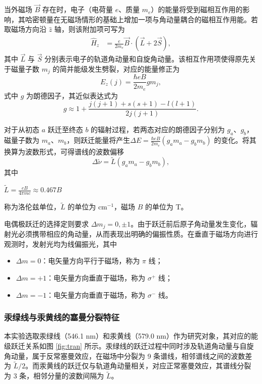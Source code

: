 \documentclass[a4paper, 1.5lines]{ctexart}
\begin{document}
当外磁场 $\vec{B}$ 存在时，电子（电荷量 $e$、质量 $m_e$）的能量将受到磁相互作用的影响，其哈密顿量在无磁场情形的基础上增加一项与角动量耦合的磁相互作用能。若取磁场方向沿 $\hat{z}$ 轴，则该附加项可写为
\begin{align}
\hat{H}_z & = \frac{e}{2m_e} \vec{B} \cdot (\vec{L} + 2\vec{S}),
\end{align}
其中 $\vec{L}$ 与 $\vec{S}$ 分别表示电子的轨道角动量和自旋角动量。该相互作用项使得原先关于磁量子数 $m_j$ 的简并能级发生劈裂，对应的能量修正为
\begin{equation}
E_z(j) = \frac{\hbar e B}{2 m_e} g m_j ,
\end{equation}
式中 $g$ 为朗德因子，其近似表达式为
\begin{equation}
g \approx 1 + \frac{j(j+1)+s(s+1)-l(l+1)}{2j(j+1)} .
\end{equation}

对于从初态 $a$ 跃迁至终态 $b$ 的辐射过程，若两态对应的朗德因子分别为 $g_a$、$g_b$，磁量子数为 $m_a$、$m_b$，则跃迁能量将产生$\Delta E = \frac{\hbar e B}{2 m_e} (g_a m_a - g_b m_b)$
的变化。将其换算为波数形式，可得谱线的波数偏移
\begin{equation}
\Delta \tilde{\nu} = \tilde{L} ( g_a m_a - g_b m_b ),
\end{equation}
其中
\centerline{$\tilde{L} = \frac{eB}{4\pi m c} \approx 0.467 B$}
称为洛伦兹单位，$\tilde{L}$ 的单位为 $\mathrm{cm}^{-1}$，磁场 $B$ 的单位为 T。

电偶极跃迁的选择定则要求 $\Delta m_j = 0, \pm 1$。由于跃迁前后原子角动量发生变化，辐射光必须携带相应的角动量，从而表现出明确的偏振性质。在垂直于磁场方向进行观测时，发射光均为线偏振光，其中
\begin{itemize}
\item $\Delta m = 0$：电矢量方向平行于磁场，称为 $\pi$ 线；
\item $\Delta m = +1$：电矢量方向垂直于磁场，称为 $\sigma^+$ 线；
\item $\Delta m = -1$：电矢量方向垂直于磁场，称为 $\sigma^-$ 线。
\end{itemize}

\subsubsection{汞绿线与汞黄线的塞曼分裂特征}

本实验选取汞绿线（546.1 nm）和汞黄线（579.0 nm）作为研究对象，其对应的能级跃迁关系如图 \ref{fig:tran} 所示。汞绿线的跃迁过程中同时涉及轨道角动量与自旋角动量，属于反常塞曼效应，在磁场中分裂为 9 条谱线，相邻谱线之间的波数差为 $\tilde{L}/2$。而汞黄线的跃迁仅与轨道角动量相关，对应正常塞曼效应，其谱线分裂为 3 条，相邻分量的波数间隔为 $\tilde{L}$。
\end{document}

